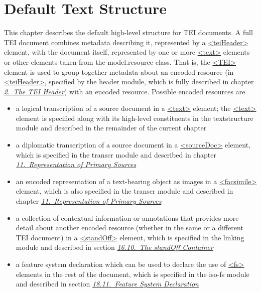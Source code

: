 
\section[{Default Text Structure}]{Default Text Structure}\label{DS}\par
This chapter describes the default high-level structure for TEI documents. A full TEI document combines metadata describing it, represented by a \hyperref[TEI.teiHeader]{<teiHeader>} element, with the document itself, represented by one or more \hyperref[TEI.text]{<text>} elements or other elements taken from the \textsf{model.resource} class. That is, the \hyperref[TEI.TEI]{<TEI>} element is used to group together metadata about an encoded resource (in \hyperref[TEI.teiHeader]{<teiHeader>}, specified by the \textsf{header} module, which is fully described in chapter \textit{\hyperref[HD]{2.\ The TEI Header}}) with an encoded resource. Possible encoded resources are \begin{itemize}
\item a logical transcription of a source document in a \hyperref[TEI.text]{<text>} element; the \hyperref[TEI.text]{<text>} element is specified along with its high-level constituents in the \textsf{textstructure} module and described in the remainder of the current chapter
\item a diplomatic transcription of a source document in a \hyperref[TEI.sourceDoc]{<sourceDoc>} element, which is specified in the \textsf{transcr} module and described in chapter \textit{\hyperref[PH]{11.\ Representation of Primary Sources}}
\item an encoded representation of a text-bearing object as images in a \hyperref[TEI.facsimile]{<facsimile>} element, which is also specified in the \textsf{transcr} module and described in chapter \textit{\hyperref[PH]{11.\ Representation of Primary Sources}}
\item a collection of contextual information or annotations that provides more detail about another encoded resource (whether in the same or a different TEI document) in a \hyperref[TEI.standOff]{<standOff>} element, which is specified in the \textsf{linking} module and described in section \textit{\hyperref[SASOstdf]{16.10.\ The standOff Container}}
\item a feature system declaration which can be used to declare the use of \hyperref[TEI.fs]{<fs>} elements in the rest of the document, which is specified in the \textsf{iso-fs} module and described in section \textit{\hyperref[FD]{18.11.\ Feature System Declaration}}
\end{itemize} \par
